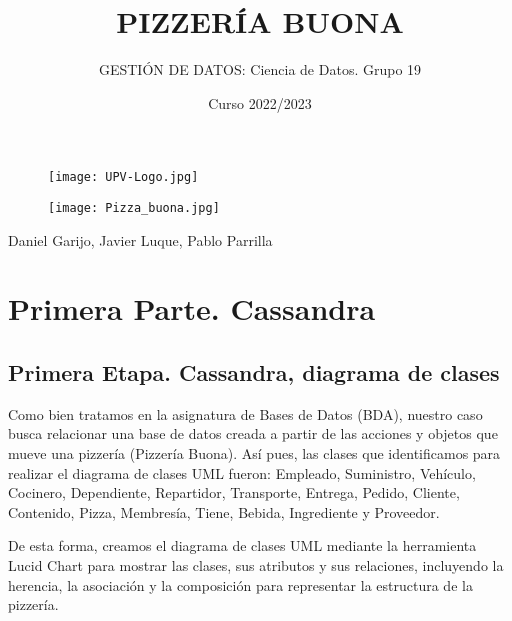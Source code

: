 \documentclass[a4paper]{article}
\title{\Huge PIZZERÍA BUONA}
\author{\LARGE GESTIÓN DE DATOS: Ciencia de Datos. Grupo 19}
\date{Curso 2022/2023}
\begin{document}
\begin{figure}
    \centering
    \texttt{[image: UPV-Logo.jpg]}
    \label{fig:logo_upv}
\end{figure}
\vspace{4mm}

\maketitle

\vspace{4mm}

\begin{figure}[H]
    \centering
    \texttt{[image: Pizza\_buona.jpg]}
    \label{fig:logo_piz}
\end{figure}

\vfill

\begin{center}
\Large Daniel Garijo, Javier Luque, Pablo Parrilla
\end{center} 

\newpage

\renewcommand\contentsname{\LARGE Índice}

\tableofcontents \vspace{3mm}

\newpage

\section{\Huge{Primera Parte. Cassandra}}
\subsection{\huge{Primera Etapa. Cassandra, diagrama de clases}}

\vspace{1.5mm}

\vspace{1.5mm} Como bien tratamos en la asignatura de Bases de Datos (BDA), nuestro caso busca relacionar una base de datos creada a partir de las acciones y objetos que mueve una pizzería (Pizzería Buona). Así pues, las clases que identificamos para realizar el diagrama de clases UML fueron: Empleado, Suministro, Vehículo, Cocinero, Dependiente, Repartidor, Transporte, Entrega, Pedido, Cliente, Contenido, Pizza, Membresía, Tiene, Bebida, Ingrediente y Proveedor.  

\vspace{1.5mm} De esta forma, creamos el diagrama de clases UML mediante la herramienta Lucid Chart para mostrar las clases, sus atributos y sus relaciones, incluyendo la herencia, la asociación y la composición para representar la estructura de la pizzería. 
\end{document}
